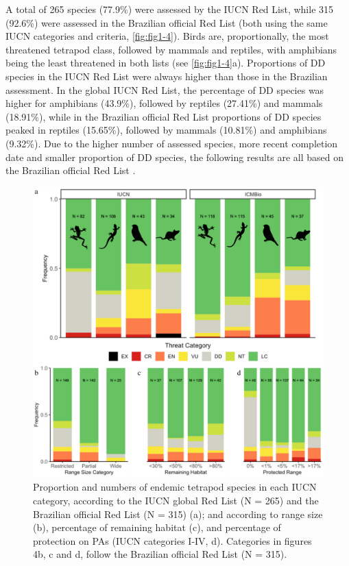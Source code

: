 \documentclass[12pt,openright,oneside,a4paper,english]{abntex2}
\begin{document}
A total of 265 species (77.9\%) were assessed by the IUCN Red List, while 315 (92.6\%) were assessed in the Brazilian official Red List (both using the same IUCN categories and criteria, \autoref{fig:fig1-4}). Birds are, proportionally, the most threatened tetrapod class, followed by mammals and reptiles, with amphibians being the least threatened in both lists (see \autoref{fig:fig1-4}a). Proportions of DD species in the IUCN Red List were always higher than those in the Brazilian assessment. In the global IUCN Red List, the percentage of DD species was higher for amphibians (43.9\%), followed by reptiles (27.41\%) and mammals (18.91\%), while in the Brazilian official Red List proportions of DD species peaked in reptiles (15.65\%), followed by mammals (10.81\%) and amphibians (9.32\%). Due to the higher number of assessed species, more recent completion date and smaller proportion of DD species, the following results are all based on the Brazilian official Red List \citep{ICMBio2023}.

\begin{figure}[H]
	\centering
	\includegraphics[width=160mm]{Fig c1-4}
	\caption[Threat assessments against range-size, habitat loss, and protection]{\small Proportion and numbers of endemic tetrapod species in each IUCN category, according to the IUCN global Red List (N = 265) and the Brazilian official Red List (N = 315) (a); and according to range size (b), percentage of remaining habitat (c), and percentage of protection on PAs (IUCN categories I-IV, d). Categories in figures 4b, c and d, follow the Brazilian official Red List (N = 315).}
	\label{fig:fig1-4}
\end{figure}
\end{document}
